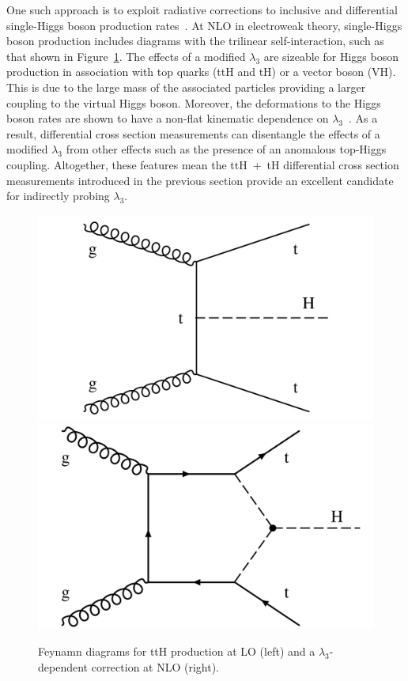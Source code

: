 One such approach is to exploit radiative corrections to inclusive and differential single-Higgs boson production rates~\cite{Degrassi:2016wml,Maltoni:2017ims,Gorbahn:2016uoy,Bizon:2016wgr,DiVita:2017eyz}. At NLO in electroweak theory, single-Higgs boson production includes diagrams with the trilinear self-interaction, such as that shown in Figure~\ref{fig:trilinear_feynman}. The effects of a modified $\lambda_3$ are sizeable for Higgs boson production in association with top quarks (ttH and tH) or a vector boson (VH). This is due to the large mass of the associated particles providing a larger coupling to the virtual Higgs boson. Moreover, the deformations to the Higgs boson rates are shown to have a non-flat kinematic dependence on $\lambda_3$~\cite{Maltoni:2017ims,DiVita:2017eyz}. As a result, differential cross section measurements can disentangle the effects of a modified $\lambda_3$ from other effects such as the presence of an anomalous top-Higgs coupling. Altogether, these features mean the ttH~+~tH differential cross section measurements introduced in the previous section provide an excellent candidate for indirectly probing $\lambda_3$.

\begin{figure}[htb!]
  \centering
  \includegraphics[width=.35\textwidth]{Figures/cms/trilinear/CMS-PAS-HIG-19-005_Figure_001-d.pdf}
  \includegraphics[width=.35\textwidth]{Figures/cms/trilinear/CMS-PAS-FTR-18-020_Figure_001.pdf}
  \caption[Feynam diagram showing a $\lambda_3$-dependent NLO correction to ttH production.]
  {
    Feynamn diagrams for ttH production at LO (left) and a $\lambda_3$-dependent correction at NLO (right).
  }
  \label{fig:trilinear_feynman}
\end{figure}

